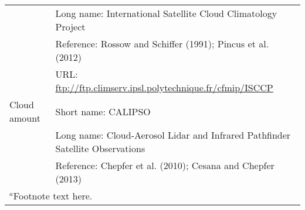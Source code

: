 \documentclass[draft]{agujournal2019}
\begin{document}
\begin{sidewaystable}
\begin{tabular}{l l}
                                                                   & Long name: International Satellite Cloud Climatology Project   \\
                                                                   & Reference: Rossow and Schiffer (1991); Pincus et al. (2012)   \\
                                                                   & URL: \url{ftp://ftp.climserv.ipsl.polytechnique.fr/cfmip/ISCCP}     \\
   Cloud amount  & Short name: CALIPSO   \\
                           & Long name: Cloud-Aerosol Lidar and Infrared Pathfinder Satellite Observations   \\
                           & Reference: Chepfer et al. (2010); Cesana and Chepfer (2013)      \\
    \hline
 \multicolumn{2}{l}{$^{a}$Footnote text here.}
 \end{tabular}
 \end{sidewaystable}



                


\end{document}
